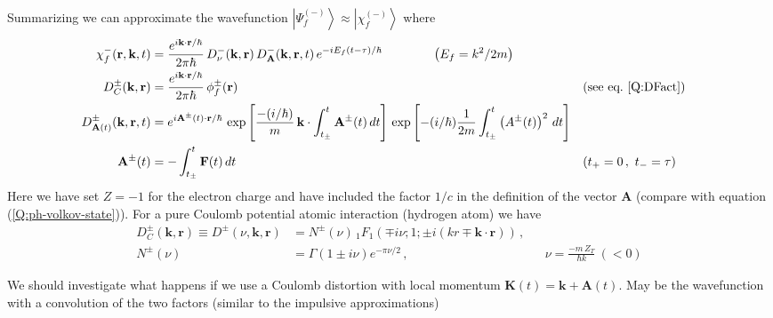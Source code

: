 Summarizing we can approximate the wavefunction $\left|\Psi_{f}^{(-)}\right\rangle \approx \left|\chi_{f}^{(-)} \right\rangle$ where
\begin{align}
  \label{Q:defin-coul-volk-state}
  \chi^{-}_{f}(\mathbf{r}, \mathbf{k}, t) &= \frac{e^{i \mathbf{k}\cdot \mathbf{r}/\hbar}}{2 \pi \hbar}\, D^{-}_{\nu}(\mathbf{k}, \mathbf{r}) \, D^{-}_{\mathbf{A}}(\mathbf{k}, \mathbf{r}, t) \, e^{-i E_{f} (t- \tau)/\hbar} \qquad \qquad \left(E_{f}=k^{2}/2m \right)\\
 D^{\pm}_{C}(\mathbf{k}, \mathbf{r}) &= \frac{e^{i \mathbf{k}\cdot \mathbf{r}/\hbar}}{2 \pi \hbar}\,\phi^{\pm}_{f}(\mathbf{r}) && (\text{see eq}.~\ref{Q:DFact})\nonumber \\
\label{Q:def-Da-CV} D^{\pm}_{\mathbf{A}(t)}(\mathbf{k}, \mathbf{r}, t) &= e^{i \mathbf{A}^{\pm}(t) \cdot \mathbf{r}/\hbar}\, \exp{\left[ \frac{-(i/\hbar)}{m}\, \mathbf{k} \cdot \int_{t_{\pm}}^{t}  \mathbf{A}^{\pm}(t)\, dt  \right]}\, \exp{\left[ -(i/\hbar)\frac{1}{2m}\int_{t_{\pm}}^{t} \left( A^{\pm}(t) \right)^{2}\, dt  \right]} \\
 \mathbf{A}^{\pm}(t) &= - \int_{t_{\pm}}^{t} \mathbf{F}(t)\, dt && (t_{+}=0 \,,~t_{-}=\tau) \nonumber
\end{align}
Here we have set $Z=-1$ for the electron charge and have included the factor $1/c$ in the definition of the vector $\bm{A}$ (compare with equation (\ref{Q:ph-volkov-state})). For a pure Coulomb potential atomic interaction (hydrogen atom) we have 
\begin{align}
  D^{\pm}_{C}(\bm{k}, \bm{r}) \equiv D^{\pm}(\nu,\bm{k},\bm{r}) &= N^{\pm}(\nu) \,{_1F_1}\left( \mp i \nu;1; {\pm} i (k r \mp \bm{k} \cdot\bm{r} ) \right) \, ,\\
  N^{\pm}(\nu) &= \Gamma(1 {\pm} i\nu) e^{-\pi \nu/2} \, , &&  \nu= \frac{-m\,Z_{T}}{\hbar k}~ (< 0)  \nonumber
\end{align}
%
\begin{aclaracion}[Suggestion] \label{S:suggestion}
We should investigate what happens if we use a Coulomb distortion with local momentum $\bm{K}(t)=\bm{k}+\bm{A}(t)$. May be the wavefunction with a convolution of the two factors (similar to the impulsive approximations)
\end{aclaracion}

